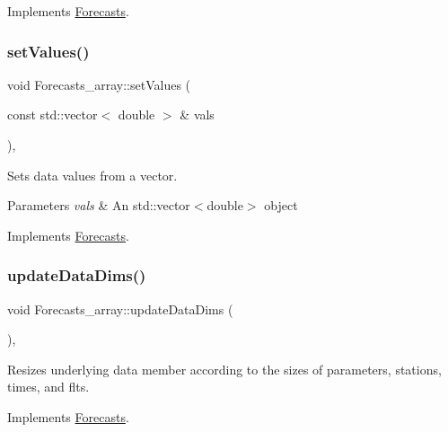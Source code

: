 Implements \mbox{\hyperlink{class_forecasts_a584820dc47f1b5c4cae099485ee59cbe}{Forecasts}}.

\mbox{\label{class_forecasts__array_af31e7741f2e048593cbec1c317210b65}} 
\subsubsection{\texorpdfstring{set\+Values()}{setValues()}}
{\footnotesize\ttfamily void Forecasts\+\_\+array\+::set\+Values (\begin{DoxyParamCaption}\item[{const std\+::vector$<$ double $>$ \&}]{vals }\end{DoxyParamCaption})\hspace{0.3cm}{\ttfamily [override]}, {\ttfamily [virtual]}}

Sets data values from a vector.


\begin{DoxyParams}{Parameters}
{\em vals} & An std\+::vector$<$double$>$ object \\
\hline
\end{DoxyParams}


Implements \mbox{\hyperlink{class_forecasts_ae2a59385e03dd372fef3dfe89f5a31cf}{Forecasts}}.

\mbox{\label{class_forecasts__array_ab3fc780bb6a5cbf132457c8c336bc777}} 
\subsubsection{\texorpdfstring{update\+Data\+Dims()}{updateDataDims()}}
{\footnotesize\ttfamily void Forecasts\+\_\+array\+::update\+Data\+Dims (\begin{DoxyParamCaption}{ }\end{DoxyParamCaption})\hspace{0.3cm}{\ttfamily [override]}, {\ttfamily [virtual]}}

Resizes underlying data member according to the sizes of parameters, stations, times, and flts. 

Implements \mbox{\hyperlink{class_forecasts_a8c7d29af8edb5c3bc6a6aad2220506a9}{Forecasts}}.



